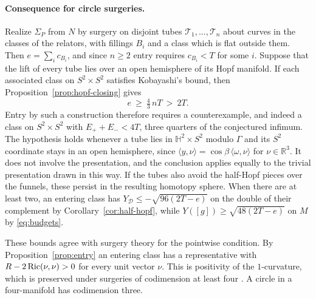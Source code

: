 \paragraph{Consequence for circle surgeries.}
Realize \(\Sigma_P\) from \(N\) by surgery on disjoint tubes
\(\mathcal T_1,\dots,\mathcal T_n\) about curves in the classes of the
relators, with fillings \(B_i\) and a class which is flat outside
them. Then \(e=\sum_i c_{B_i}\), and since \(n\ge2\) entry requires
\(c_{B_i}<T\) for some \(i\). Suppose that the lift of every tube lies
over an open hemisphere of its Hopf manifold. If each associated class
on \(S^2\times S^2\) satisfies Kobayashi's bound, then
Proposition~\ref{prop:hopf-closing} gives
\[
 e\ \ge\ \tfrac43\,nT\ >\ 2T .
\]
Entry by such a construction therefore requires a counterexample, and
indeed a class on \(S^2\times S^2\) with \(E_++E_-<4T\), three quarters
of the conjectured infimum. The hypothesis holds whenever a tube lies
in \(\mathbb H^2\times S^2\) modulo \(\Gamma\) and its \(S^2\)
coordinate stays in an open hemisphere, since
\(\langle y,\nu\rangle=\cos\beta\,\langle\omega,\nu\rangle\) for
\(\nu\in\mathbb R^3\). It does not involve the presentation, and the
conclusion applies equally to the trivial presentation drawn in this
way. If the tubes also avoid the half-Hopf pieces over the funnels,
these persist in the resulting homotopy sphere. When there are at
least two, an entering class has
\(Y_{\mathcal D}\le-\sqrt{96(2T-e)}\) on the double of their
complement by Corollary~\ref{cor:half-hopf}, while
\(Y([g])\ge\sqrt{48(2T-e)}\) on \(M\) by \eqref{eq:budgets}.

These bounds agree with surgery theory for the pointwise condition. By
Proposition~\ref{prop:entry} an entering class has a representative
with \(R-2\operatorname{Ric}(\nu,\nu)>0\) for every unit vector \(\nu\). This is
positivity of the \(1\)-curvature, which is preserved under surgeries
of codimension at least four \cite{Labbi1997Surgery}. A circle in a
four-manifold has codimension three.


